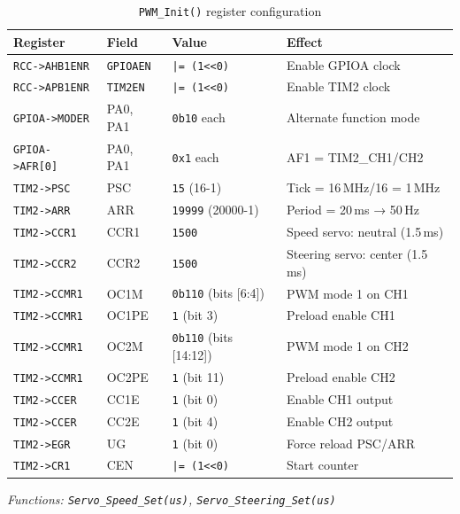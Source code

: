 \documentclass[12pt,a4paper]{article}
\begin{document}
\begin{table}[H]
\centering
\begin{tabular}{llll}
\hline
\textbf{Register} & \textbf{Field} & \textbf{Value} & \textbf{Effect} \\
\hline
\texttt{RCC->AHB1ENR} & \texttt{GPIOAEN} & \texttt{|= (1<<0)}  & Enable GPIOA clock \\
\texttt{RCC->APB1ENR} & \texttt{TIM2EN}  & \texttt{|= (1<<0)}  & Enable TIM2 clock \\
\texttt{GPIOA->MODER} & PA0, PA1 & \texttt{0b10} each & Alternate function mode \\
\texttt{GPIOA->AFR[0]} & PA0, PA1 & \texttt{0x1} each & AF1 = TIM2\_CH1/CH2 \\
\texttt{TIM2->PSC}    & PSC & \texttt{15} (16-1) & Tick = 16\,MHz/16 = 1\,MHz \\
\texttt{TIM2->ARR}    & ARR & \texttt{19999} (20000-1) & Period = 20\,ms → 50\,Hz \\
\texttt{TIM2->CCR1}   & CCR1 & \texttt{1500} & Speed servo: neutral (1.5\,ms) \\
\texttt{TIM2->CCR2}   & CCR2 & \texttt{1500} & Steering servo: center (1.5\,ms) \\
\texttt{TIM2->CCMR1}  & OC1M & \texttt{0b110} (bits [6:4]) & PWM mode 1 on CH1 \\
\texttt{TIM2->CCMR1}  & OC1PE & \texttt{1} (bit 3) & Preload enable CH1 \\
\texttt{TIM2->CCMR1}  & OC2M & \texttt{0b110} (bits [14:12]) & PWM mode 1 on CH2 \\
\texttt{TIM2->CCMR1}  & OC2PE & \texttt{1} (bit 11) & Preload enable CH2 \\
\texttt{TIM2->CCER}   & CC1E & \texttt{1} (bit 0) & Enable CH1 output \\
\texttt{TIM2->CCER}   & CC2E & \texttt{1} (bit 4) & Enable CH2 output \\
\texttt{TIM2->EGR}    & UG   & \texttt{1} (bit 0) & Force reload PSC/ARR \\
\texttt{TIM2->CR1}    & CEN  & \texttt{|= (1<<0)} & Start counter \\
\hline
\end{tabular}
\caption{\texttt{PWM\_Init()} register configuration}
\end{table}

\textit{Functions: \texttt{Servo\_Speed\_Set(us)}, \texttt{Servo\_Steering\_Set(us)}}
\end{document}
